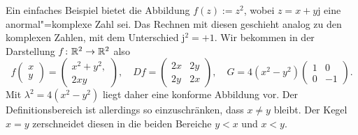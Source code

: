 Ein einfaches Beispiel bietet die Abbildung $f(z):=z^2$, wobei
$z=x+y\mathrm j$ eine anormal"=komplexe Zahl sei. Das Rechnen mit
diesen geschieht analog zu den komplexen Zahlen, mit dem Unterschied
$\mathrm j^2=+1$. Wir bekommen in der Darstellung $f\colon\mathbb R^2\to\mathbb R^2$
also
\begin{equation}
f\begin{pmatrix}x\\ y\end{pmatrix}
= \begin{pmatrix}x^2 + y^2,\\ 2xy\end{pmatrix},
\quad Df = \begin{pmatrix}2x & 2y \\ 2y & 2x\end{pmatrix},
\quad G = 4(x^2-y^2)\begin{pmatrix}1 & 0\\ 0 & -1\end{pmatrix}.
\end{equation}
Mit $\lambda^2 = 4(x^2-y^2)$ liegt daher eine konforme Abbildung vor.
Der Definitionsbereich ist allerdings so einzuschränken,
dass $x\ne y$ bleibt. Der Kegel $x=y$ zerschneidet diesen
in die beiden Bereiche $y<x$ und $x<y$.

